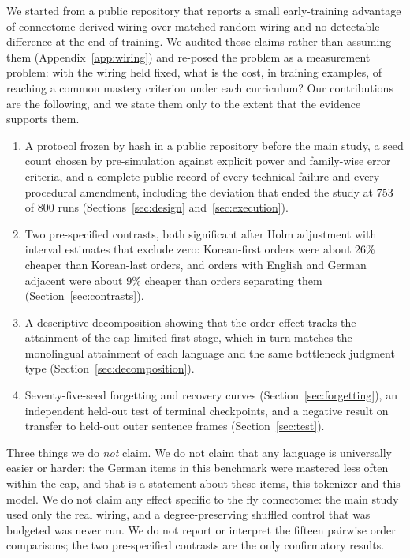 \documentclass[preprint,12pt,authoryear]{elsarticle}
\begin{document}
We started from a public repository \citep{flygpt} that reports a small early-training advantage of connectome-derived wiring over matched random wiring and no detectable difference at the end of training. We audited those claims rather than assuming them (Appendix~\ref{app:wiring}) and re-posed the problem as a measurement problem: with the wiring held fixed, what is the cost, in training examples, of reaching a common mastery criterion under each curriculum? Our contributions are the following, and we state them only to the extent that the evidence supports them.

\begin{enumerate}
\item A protocol frozen by hash in a public repository before the main study, a seed count chosen by pre-simulation against explicit power and family-wise error criteria, and a complete public record of every technical failure and every procedural amendment, including the deviation that ended the study at 753 of 800 runs (Sections~\ref{sec:design} and~\ref{sec:execution}).
\item Two pre-specified contrasts, both significant after Holm adjustment with interval estimates that exclude zero: Korean-first orders were about 26\% cheaper than Korean-last orders, and orders with English and German adjacent were about 9\% cheaper than orders separating them (Section~\ref{sec:contrasts}).
\item A descriptive decomposition showing that the order effect tracks the attainment of the cap-limited first stage, which in turn matches the monolingual attainment of each language and the same bottleneck judgment type (Section~\ref{sec:decomposition}).
\item Seventy-five-seed forgetting and recovery curves (Section~\ref{sec:forgetting}), an independent held-out test of terminal checkpoints, and a negative result on transfer to held-out outer sentence frames (Section~\ref{sec:test}).
\end{enumerate}

Three things we do \emph{not} claim. We do not claim that any language is universally easier or harder: the German items in this benchmark were mastered less often within the cap, and that is a statement about these items, this tokenizer and this model. We do not claim any effect specific to the fly connectome: the main study used only the real wiring, and a degree-preserving shuffled control that was budgeted was never run. We do not report or interpret the fifteen pairwise order comparisons; the two pre-specified contrasts are the only confirmatory results.
\end{document}
